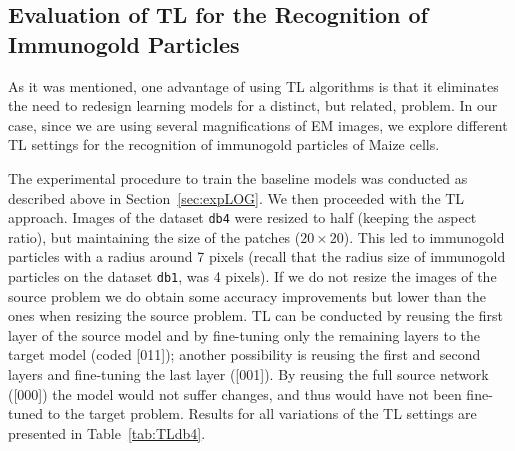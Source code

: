 \documentclass[a4paper,11pt]{article}
\newcommand{\1}{\mathbbm{1}}
\newcommand{\tref}[1]{Table~\ref{#1}}
\newcommand{\sref}[1]{Section~\ref{#1}}
\newcommand{\db}[1]{\texttt{#1}}
\theoremstyle{plain}
\begin{document}
%
\subsection{Evaluation of TL for the Recognition of Immunogold Particles}\label{sec:expTL}
As it was mentioned, one advantage of using \ac{TL} algorithms is that it eliminates the need to redesign learning models for a distinct, but related, problem. In our case, since we are using several magnifications of \ac{EM} images, we explore different \ac{TL} settings for the recognition of immunogold particles of Maize cells.

The experimental procedure to train the baseline models was conducted as described above in \sref{sec:expLOG}. We then proceeded with the \ac{TL} approach. Images of the dataset \db{db4} were resized to half (keeping the aspect ratio), but maintaining the size of the patches ($20\times 20$). This led to immunogold particles with a radius around 7 pixels (recall that the radius size of immunogold particles on the dataset \db{db1}, was 4 pixels). If we do not resize the images of the source problem we do obtain some accuracy improvements but lower than the ones when resizing the source problem.
\ac{TL} can be conducted by reusing the first layer of the source model and by fine-tuning only the remaining layers to the target model (coded [011]); another possibility is reusing the first and second layers and fine-tuning the last layer ([001]). By reusing the full source network ([000]) the model would not suffer changes, and thus would have not been fine-tuned to the target problem. Results for all variations of the \ac{TL} settings are presented in \tref{tab:TLdb4}.
\end{document}
